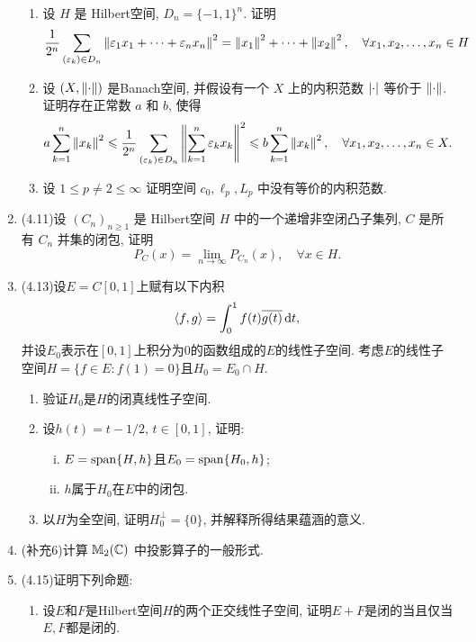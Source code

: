 \begin{enumerate}[label=\textbf{\arabic*.}, ref=\arabic*]
		\begin{enumerate}[(1)]
			\item 设 $ H $ 是 Hilbert空间, $ D_{n}=\{ -1, 1 \}^{n} $. 证明
			\[
				\frac{1}{2^{n}}\sum_{(\varepsilon_{k})\in D_{n}}\left\| \varepsilon_{1}x_{1}+\cdots+\varepsilon_{n}x_{n} \right\|^{2}=\left\| x_{1} \right\|^{2}+\cdots+\left\| x_{2} \right\|^{2}, \quad \forall x_{1}, x_{2}, \dots, x_{n}\in H
			\]
	  		\item 设 $ (X, \left\| \cdot \right\|) $ 是Banach空间, 并假设有一个 $ X $ 上的内积范数 $ \left| \cdot \right|  $ 等价于 $ \left\| \cdot \right\| $. 证明存在正常数 $ a $ 和 $ b $, 使得
	  		\[
				a\sum_{k=1}^{n}\left\| x_{k} \right\|^{2}\leqslant\frac{1}{2^{n}}\sum_{(\varepsilon_{k})\in D_{n}}\left\| \sum_{k=1}^{n}\varepsilon_{k}x_{k} \right\|^{2}\leqslant b\sum_{k=1}^{n}\left\| x_{k} \right\|^{2}, \quad \forall x_{1}, x_{2}, \dots, x_{n} \in X.
			\]
			\item 设 $ 1\leqslant p\ne2\leqslant\infty $ 证明空间 $ c_{0}, \ell_{p}, L_{p} $ 中没有等价的内积范数. 
		\end{enumerate}
	\item (4.11)设 $ (C_{n})_{n\geqslant1} $ 是 Hilbert空间 $ H $ 中的一个递增非空闭凸子集列,  $ C $ 是所有 $ C_{n} $ 并集的闭包, 证明 
		\[
			P_{C}(x) = \lim_{n\to \infty}P_{C_{n}}(x), \quad \forall x\in H.
		\]
	\item (4.13)设$ E=C[0,1] $上赋有以下内积
		\[
		\left\langle f,g \right\rangle=\int_0^1f(t)\overline{g(t)}\,\mathrm{d} t,
		\]
		并设$ E_0 $表示在$ [0,1] $上积分为0的函数组成的$ E $的线性子空间. 考虑$ E $的线性子空间$ H=\{ f\in E : f(1)=0 \} $且$ H_0=E_0\cap H $.
		\begin{enumerate}[(1)]
		\item 验证$ H_0 $是$ H $的闭真线性子空间.
		\item 设$ h(t)=t-1/2 $, $ t\in[0,1] $, 证明:
		\begin{enumerate}[(i)]
		\item $ E=\operatorname{span}\{H,h\} $且$ E_0=\operatorname{span}\{H_0,h\} $;
		\item $ h $属于$ H_0 $在$ E $中的闭包.
		\end{enumerate}
		\item 以$ H $为全空间, 证明$ H_0^\bot=\{0\} $, 并解释所得结果蕴涵的意义. 
		\end{enumerate}
	\item (补充6)计算 $ \mathbb{M}_{2}(\mathbb{C}) $ 中投影算子的一般形式. 
	\item (4.15)证明下列命题:
		\begin{enumerate}[(1)]
		\item 设$ E $和$ F $是Hilbert空间$ H $的两个正交线性子空间, 证明$ E+F $是闭的当且仅当$ E, F $都是闭的.

\end{enumerate}
\end{enumerate}
